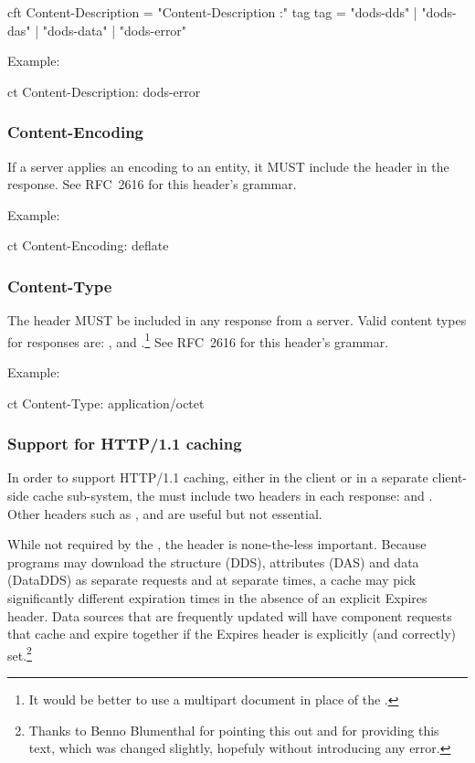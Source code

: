 \documentclass[justify]{nasa-ese}
\begin{document}
\begin{vcode}{cft}
Content-Description = "Content-Description :" tag 
tag                 = "dods-dds" | "dods-das" | "dods-data" | "dods-error" 
\end{vcode}

Example:
\begin{vcode}{ct}
Content-Description: dods-error
\end{vcode}

\subsubsection{Content-Encoding}
\label{content-encoding}
If a \DAP server applies an encoding to an entity, it MUST include the
 header in the response. See RFC~2616\cite{rfc2616}
for this header's grammar.

Example:
\begin{vcode}{ct}
Content-Encoding: deflate
\end{vcode}

\subsubsection{Content-Type}
The  header MUST be included in any response from a
\DAP server. Valid content types for \DAP responses are:
,  and
.\footnote{It would be better to use a multipart
  document in place of the .} See RFC~2616\cite{rfc2616} for this header's grammar.

Example:
\begin{vcode}{ct}
Content-Type: application/octet
\end{vcode}


\subsubsection{Support for HTTP/1.1 caching}
\label{sec-http-caching}

In order to support HTTP/1.1 caching, either in the client or in a
separate client-side cache sub-system, the \DAP must include two
headers in each response:  and . Other
headers such as ,  and  are
useful but not essential. 

While not required by the \DAP, the  header is
none-the-less important. Because programs may download the structure
(DDS), attributes (DAS) and data (DataDDS) as separate requests and at
separate times, a cache may pick significantly different expiration
times in the absence of an explicit Expires header. Data sources that
are frequently updated will have \DAP component requests that cache
and expire together if the Expires header is explicitly (and
correctly) set.\footnote{Thanks to Benno Blumenthal for pointing this
  out and for providing this text, which was changed slightly,
  hopefuly without introducing any error.}
\end{document}
